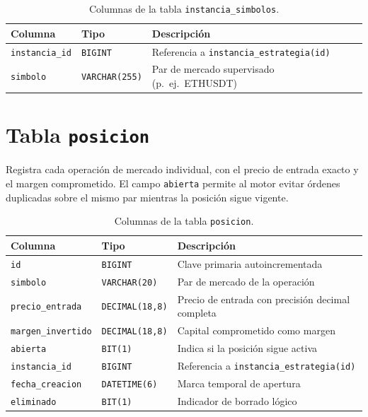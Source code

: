 \begin{table}[h]
\centering
\caption{Columnas de la tabla \texttt{instancia\_simbolos}.}
\label{tab:sql-simbolos}
\begin{tabular}{@{}llp{7cm}@{}}
\toprule
\textbf{Columna} & \textbf{Tipo} & \textbf{Descripción} \\
\midrule
\texttt{instancia\_id} & \texttt{BIGINT}       & Referencia a \texttt{instancia\_estrategia(id)} \\
\texttt{simbolo}       & \texttt{VARCHAR(255)} & Par de mercado supervisado (p.\ ej.\ ETHUSDT) \\
\bottomrule
\end{tabular}
\end{table}

\section*{Tabla \texttt{posicion}}

Registra cada operación de mercado individual, con el precio de entrada exacto y el margen comprometido. El campo \texttt{abierta} permite al motor evitar órdenes duplicadas sobre el mismo par mientras la posición sigue vigente.

\begin{table}[h]
\centering
\caption{Columnas de la tabla \texttt{posicion}.}
\label{tab:sql-posicion}
\begin{tabular}{@{}llp{6.5cm}@{}}
\toprule
\textbf{Columna} & \textbf{Tipo} & \textbf{Descripción} \\
\midrule
\texttt{id}               & \texttt{BIGINT}        & Clave primaria autoincrementada \\
\texttt{simbolo}          & \texttt{VARCHAR(20)}   & Par de mercado de la operación \\
\texttt{precio\_entrada}  & \texttt{DECIMAL(18,8)} & Precio de entrada con precisión decimal completa \\
\texttt{margen\_invertido}& \texttt{DECIMAL(18,8)} & Capital comprometido como margen \\
\texttt{abierta}          & \texttt{BIT(1)}        & Indica si la posición sigue activa \\
\texttt{instancia\_id}    & \texttt{BIGINT}        & Referencia a \texttt{instancia\_estrategia(id)} \\
\texttt{fecha\_creacion}  & \texttt{DATETIME(6)}   & Marca temporal de apertura \\
\texttt{eliminado}        & \texttt{BIT(1)}        & Indicador de borrado lógico \\
\bottomrule
\end{tabular}
\end{table}

